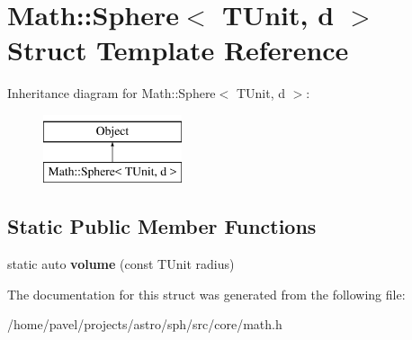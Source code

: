 \hypertarget{structMath_1_1Sphere}{}\section{Math\+:\+:Sphere$<$ T\+Unit, d $>$ Struct Template Reference}
\label{structMath_1_1Sphere}
Inheritance diagram for Math\+:\+:Sphere$<$ T\+Unit, d $>$\+:\begin{figure}[H]
\begin{center}
\leavevmode
\includegraphics[height=2.000000cm]{structMath_1_1Sphere}
\end{center}
\end{figure}
\subsection*{Static Public Member Functions}
\begin{DoxyCompactItemize}
\item 
\hypertarget{structMath_1_1Sphere_a313c64ec2e2ca5da0d1fb39c696c6846}{}\label{structMath_1_1Sphere_a313c64ec2e2ca5da0d1fb39c696c6846} 
static auto {\bfseries volume} (const T\+Unit radius)
\end{DoxyCompactItemize}


The documentation for this struct was generated from the following file\+:\begin{DoxyCompactItemize}
\item 
/home/pavel/projects/astro/sph/src/core/math.\+h\end{DoxyCompactItemize}
